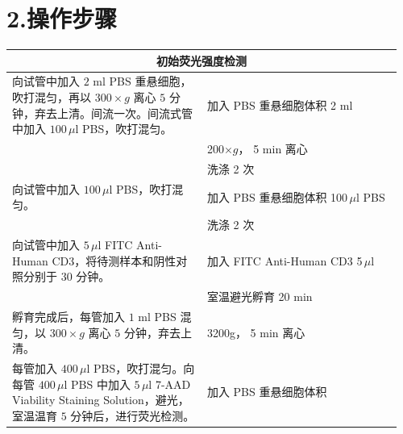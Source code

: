 \documentclass[UTF8,10pt,a4paper,fontset=fandol]{ctexart}
\newcommand{\fieldvalue}[1]{#1}
\newcommand{\handwritten}[1]{#1}
\begin{document}
\section{2.\quad 操作步骤}

\begin{tabular}{|p{0.48\linewidth}|p{0.48\linewidth}|}
\hline
\multicolumn{2}{|c|}{初始荧光强度检测} \\
\hline
向试管中加入 $2$ ml PBS 重悬细胞，吹打混匀，再以 $300\times g$ 离心 $5$ 分钟，弃去上清。间流一次。间流式管中加入 $100\,\mu$l PBS，吹打混匀。 &
加入 PBS 重悬细胞体积
\fieldvalue{\handwritten{2 ml}} \\[-2pt]
&
\fieldvalue{\handwritten{200$\times g$}}， 
\fieldvalue{\handwritten{5 min}} 离心 \\[-2pt]
&
洗涤
\fieldvalue{\handwritten{2}} 次 \\
\hline
向试管中加入 $100\,\mu$l PBS，吹打混匀。 &
加入 PBS 重悬细胞体积
\fieldvalue{\handwritten{100\,$\mu$l}} PBS \\[-2pt]
&
洗涤
\fieldvalue{\handwritten{2}} 次 \\
\hline
向试管中加入 $5\,\mu$l FITC Anti-Human CD3，将待测样本和阴性对照分别于 $30$ 分钟。 &
加入 FITC Anti-Human CD3
\fieldvalue{\handwritten{5\,$\mu$l}} \\[-2pt]
&
室温避光孵育
\fieldvalue{\handwritten{20 min}} \\
\hline
孵育完成后，每管加入 $1$ ml PBS 混匀，以 $300\times g$ 离心 $5$ 分钟，弃去上清。 &
\fieldvalue{\handwritten{3200g}}，
\fieldvalue{\handwritten{5 min}} 离心 \\
\hline
每管加入 $400\,\mu$l PBS，吹打混匀。向每管 $400\,\mu$l PBS 中加入 $5\,\mu$l 7-AAD Viability Staining Solution，避光，室温温育 $5$ 分钟后，进行荧光检测。 &
加入 PBS 重悬细胞体积

\end{tabular}
\end{document}
